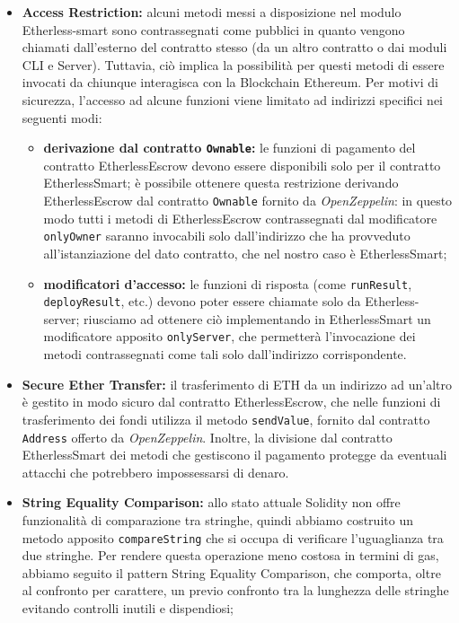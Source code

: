   \begin{itemize}
    \item \textbf{Access Restriction:} alcuni metodi messi a disposizione nel modulo Etherless-smart sono contrassegnati come pubblici in quanto vengono chiamati dall'esterno del contratto stesso (da un altro contratto o dai moduli CLI e Server). Tuttavia, ciò implica la possibilità per questi metodi di essere invocati da chiunque interagisca con la Blockchain Ethereum. Per motivi di sicurezza, l'accesso ad alcune funzioni viene limitato ad indirizzi specifici nei seguenti modi:
      \begin{itemize}
        \item \textbf{derivazione dal contratto \texttt{Ownable}:} le funzioni di pagamento del contratto EtherlessEscrow devono essere disponibili solo per il contratto EtherlessSmart; è possibile ottenere questa restrizione derivando EtherlessEscrow dal contratto \texttt{Ownable} fornito da \textit{OpenZeppelin}: in questo modo tutti i metodi di EtherlessEscrow contrassegnati dal modificatore \texttt{onlyOwner} saranno invocabili solo dall'indirizzo che ha provveduto all'istanziazione del dato contratto, che nel nostro caso è EtherlessSmart;
        \item \textbf{modificatori d'accesso:} le funzioni di risposta (come \texttt{runResult}, \texttt{deployResult}, etc.) devono poter essere chiamate solo da Etherless-server; riusciamo ad ottenere ciò implementando in EtherlessSmart un modificatore apposito \texttt{onlyServer}, che permetterà l'invocazione dei metodi contrassegnati come tali solo dall'indirizzo corrispondente.
      \end{itemize}

    \item \textbf{Secure Ether Transfer:} il trasferimento di ETH da un indirizzo ad un'altro è gestito in modo sicuro dal contratto EtherlessEscrow, che nelle funzioni di trasferimento dei fondi utilizza il metodo \texttt{sendValue}, fornito dal contratto \texttt{Address} offerto da \textit{OpenZeppelin}. Inoltre, la divisione dal contratto EtherlessSmart dei metodi che gestiscono il pagamento protegge da eventuali attacchi che potrebbero impossessarsi di denaro.

    \item \textbf{String Equality Comparison:} allo stato attuale Solidity non offre funzionalità di comparazione tra stringhe, quindi abbiamo costruito un metodo apposito \texttt{compareString} che si occupa di verificare l'uguaglianza tra due stringhe. Per rendere questa operazione meno costosa in termini di gas, abbiamo seguito il pattern String Equality Comparison, che comporta, oltre al confronto per carattere, un previo confronto tra la lunghezza delle stringhe evitando controlli inutili e dispendiosi;


\end{itemize}
